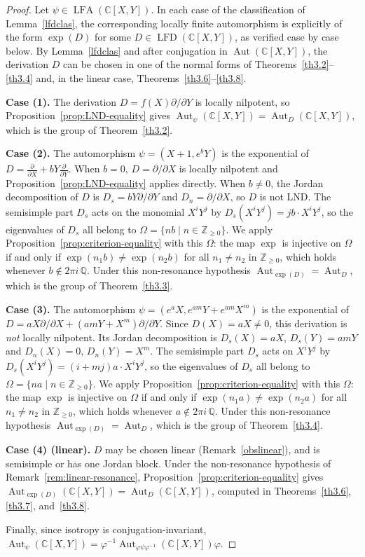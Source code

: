 \documentclass[11pt,a4paper,reqno]{amsart}
\newcommand{\Aut}[0]{\ensuremath{\operatorname{Aut}}}
\begin{document}
\begin{proof}
Let $\psi\in\operatorname{LFA}(\mathbb{C}[X,Y])$. In each case of the classification of Lemma~\ref{lfdclas}, the corresponding locally finite automorphism is explicitly of the form $\exp(D)$ for some $D\in\operatorname{LFD}(\mathbb{C}[X,Y])$, as verified case by case below. By Lemma~\ref{lfdclas} and after conjugation in $\Aut(\mathbb{C}[X,Y])$, the derivation $D$ can be chosen in one of the normal forms of Theorems~\ref{th3.2}--\ref{th3.4} and, in the linear case, Theorems~\ref{th3.6}--\ref{th3.8}.
 
\textbf{Case (1).} The derivation $D=f(X)\partial/\partial Y$ is locally nilpotent, so Proposition~\ref{prop:LND-equality} gives $\Aut_{\psi}(\mathbb{C}[X,Y])=\Aut_D(\mathbb{C}[X,Y])$, which is the group of Theorem~\ref{th3.2}.
 
\textbf{Case (2).} The automorphism $\psi=(X+1,e^bY)$ is the exponential of $D=\tfrac{\partial}{\partial X}+bY\tfrac{\partial}{\partial Y}$. When $b=0$, $D=\partial/\partial X$ is locally nilpotent and Proposition~\ref{prop:LND-equality} applies directly. When $b\neq 0$, the Jordan decomposition of $D$ is $D_s=bY\partial/\partial Y$ and $D_n=\partial/\partial X$, so $D$ is not LND. The semisimple part $D_s$ acts on the monomial $X^iY^j$ by $D_s(X^iY^j)=jb\cdot X^iY^j$, so the eigenvalues of $D_s$ all belong to $\Omega=\{nb\mid n\in\mathbb{Z}_{\ge0}\}$. We apply Proposition~\ref{prop:criterion-equality} with this $\Omega$: the map $\exp$ is injective on $\Omega$ if and only if $\exp(n_1 b)\neq\exp(n_2 b)$ for all $n_1\neq n_2$ in $\mathbb{Z}_{\ge0}$, which holds whenever $b\notin 2\pi i\,\mathbb{Q}$. Under this non-resonance hypothesis $\Aut_{\exp(D)}=\Aut_D$, which is the group of Theorem~\ref{th3.3}.
 
\textbf{Case (3).} The automorphism $\psi=(e^aX, e^{am}Y+e^{am}X^m)$ is the exponential of $D=aX\partial/\partial X+(amY+X^m)\partial/\partial Y$. Since $D(X)=aX\neq 0$, this derivation is \emph{not} locally nilpotent. Its Jordan decomposition is $D_s(X)=aX$, $D_s(Y)=amY$ and $D_n(X)=0$, $D_n(Y)=X^m$. The semisimple part $D_s$ acts on $X^iY^j$ by $D_s(X^iY^j)=(i+mj)a\cdot X^iY^j$, so the eigenvalues of $D_s$ all belong to $\Omega=\{na\mid n\in\mathbb{Z}_{\ge0}\}$. We apply Proposition~\ref{prop:criterion-equality} with this $\Omega$: the map $\exp$ is injective on $\Omega$ if and only if $\exp(n_1 a)\neq\exp(n_2 a)$ for all $n_1\neq n_2$ in $\mathbb{Z}_{\ge0}$, which holds whenever $a\notin 2\pi i\,\mathbb{Q}$. Under this non-resonance hypothesis $\Aut_{\exp(D)}=\Aut_D$, which is the group of Theorem~\ref{th3.4}.
 
\textbf{Case (4) (linear).} $D$ may be chosen linear (Remark~\ref{obslinear}), and is semisimple or has one Jordan block. Under the non-resonance hypothesis of Remark~\ref{rem:linear-resonance}, Proposition~\ref{prop:criterion-equality} gives $\Aut_{\exp(D)}(\mathbb{C}[X,Y])=\Aut_D(\mathbb{C}[X,Y])$, computed in Theorems~\ref{th3.6}, \ref{th3.7}, and~\ref{th3.8}.
 
Finally, since isotropy is conjugation-invariant, $\operatorname{Aut}_{\psi}(\mathbb{C}[X,Y])=\varphi^{-1}\operatorname{Aut}_{\varphi\psi\varphi^{-1}}(\mathbb{C}[X,Y])\varphi$.
\end{proof}
 
 

 
 
 
\end{document}
